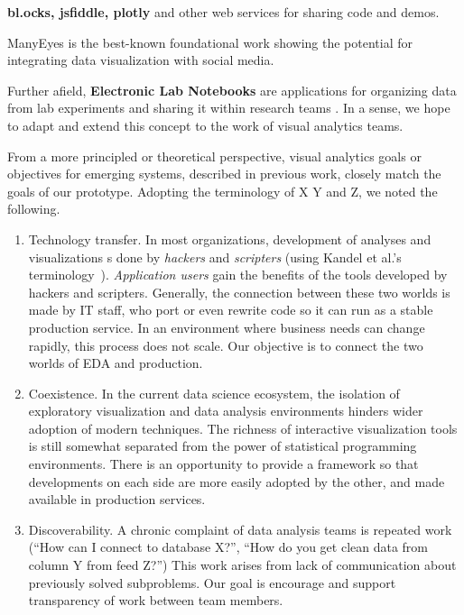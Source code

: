 {\bf bl.ocks, jsfiddle, plotly} and other web services for sharing code
and demos.

{ManyEyes} is the best-known foundational work showing the potential for
integrating data visualization with social media.

Further afield, {\bf Electronic Lab Notebooks} are applications for organizing
data from lab experiments and sharing it within research teams \cite{Rubacha:ELN:2011}. In a sense, we hope to adapt and extend this concept to the work of
visual analytics teams.

From a more principled or theoretical perspective, visual analytics goals
or objectives for emerging systems, described in previous work, closely match
the goals of our prototype.  Adopting the terminology of X Y and Z, we noted
the following.

\begin{enumerate}

\item Technology transfer.
In most organizations, development of analyses and visualizations 
s done by \emph{hackers} and \emph{scripters} (using Kandel et al.'s
terminology~\cite{Kandel:2012:EDA}). \emph{Application users} 
gain the benefits of the tools developed by hackers and scripters.
Generally, the connection between these two worlds is made by IT staff,
who port or even rewrite code so it can run as a stable production service.
In an environment where business needs can change rapidly, this
process does not scale. Our objective is to connect the two worlds
of EDA and production.

\item Coexistence. In the current data science ecosystem, the
isolation of exploratory visualization and data analysis
environments hinders wider adoption of modern techniques.
The richness of interactive visualization tools is still somewhat
separated from the power of statistical programming environments.
There is an opportunity to provide a framework so that developments
on each side are more easily adopted by the other, and made available
in production services.

\item Discoverability. A chronic complaint of data analysis teams is
repeated work (``How can I connect to database X?'', ``How do you get
clean data from column Y from feed Z?'')  This work arises from lack of
communication about previously solved subproblems.  Our goal is encourage
and support transparency of work between team members.

\end{enumerate}

